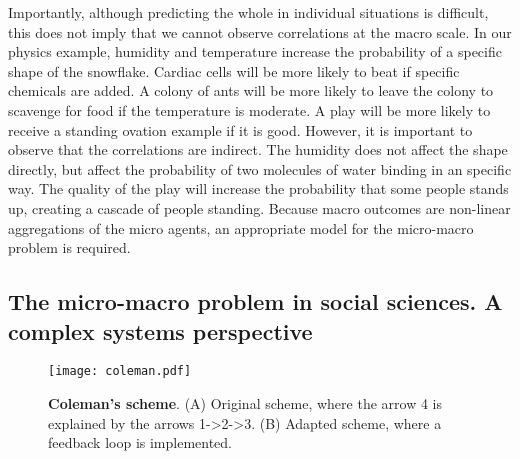 Importantly, although predicting the whole in individual situations is difficult, 
this does not imply that we cannot observe correlations at the macro scale. 
In our physics example, humidity and temperature increase the probability of a specific shape of the snowflake. 
Cardiac cells will be more likely to beat if specific chemicals are added.
A colony of ants will be more likely to leave the colony to scavenge for food if the temperature is moderate. 
A play will be more likely to receive a standing ovation example if it is good.
However, it is important to observe that the correlations are indirect.
The humidity does not affect the shape directly, but affect the probability of two molecules of water binding in an specific way. 
The quality of the play will increase the probability that some people stands up, 
creating a cascade of people standing. 
Because macro outcomes are non-linear aggregations of the micro agents, 
an appropriate model for the micro-macro problem is required.


\subsection{The micro-macro problem in social sciences. A complex systems perspective}
\label{sec:complexSocialSystems}
\begin{figure}[h!]
\begin{center}
\texttt{[image: coleman.pdf]}
\end{center}
\caption{\textbf{Coleman's scheme}. (A) Original scheme, where the arrow 4 is explained by the arrows 1->2->3. (B) Adapted scheme, where a feedback loop is implemented.}
\label{fig:coleman_scheme}
\end{figure}

